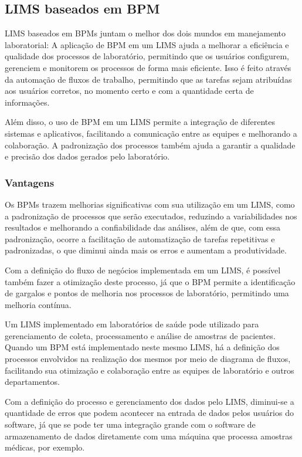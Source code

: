 \subsection{LIMS baseados em BPM}


LIMS baseados em BPMs juntam o melhor dos dois mundos em manejamento laboratorial: A aplicação de BPM em um LIMS ajuda a melhorar a eficiência e qualidade dos processos de laboratório, permitindo que os usuários configurem, gerenciem e monitorem os processos de forma mais eficiente. Isso é feito através da automação de fluxos de trabalho, permitindo que as tarefas sejam atribuídas aos usuários corretos, no momento certo e com a quantidade certa de informações.

Além disso, o uso de BPM em um LIMS permite a integração de diferentes sistemas e aplicativos, facilitando a comunicação entre as equipes e melhorando a colaboração. A padronização dos processos também ajuda a garantir a qualidade e precisão dos dados gerados pelo laboratório.


\subsubsection{Vantagens}

Os BPMs trazem melhorias significativas com sua utilização em um LIMS, como a padronização de processos que serão executados, reduzindo a variabilidades nos resultados e melhorando a confiabilidade das análises, além de que, com essa padronização, ocorre a facilitação de automatização de tarefas repetitivas e padronizadas, o que diminui ainda mais os erros e aumentam a produtividade.

Com a definição do fluxo de negócios implementada em um LIMS, é possível também fazer a otimização deste processo, já que o BPM permite a identificação de gargalos e pontos de melhoria nos processos de laboratório, permitindo uma melhoria contínua.

Um LIMS implementado em laboratórios de saúde pode utilizado para gerenciamento de coleta, processamento e análise de amostras de pacientes. Quando um BPM está implementado neste mesmo LIMS, há a definição dos processos envolvidos na realização dos mesmos por meio de diagrama de fluxos, facilitando sua otimização e colaboração entre as equipes de laboratório e outros departamentos.

Com a definição do processo e gerenciamento dos dados pelo LIMS, diminui-se a quantidade de erros que podem acontecer na entrada de dados pelos usuários do software, já que se pode ter uma integração grande com o software de armazenamento de dados diretamente com uma máquina que processa amostras médicas, por exemplo.

